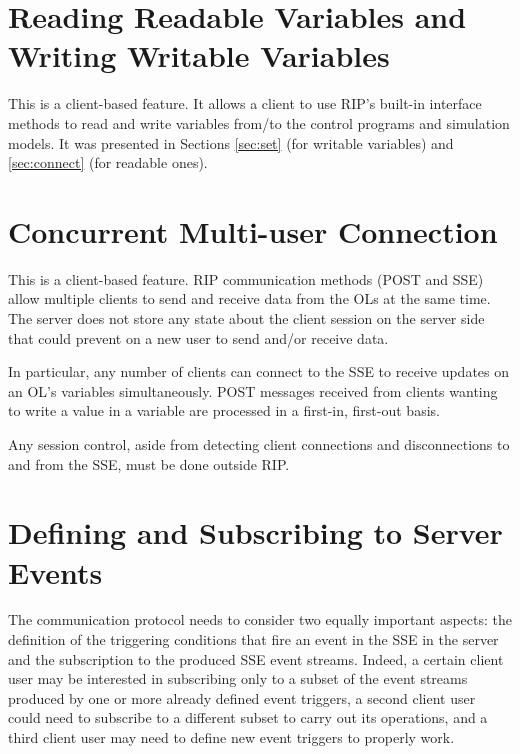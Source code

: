 \section{Reading Readable Variables and Writing Writable Variables}
This is a client-based feature. It allows a client to use RIP's built-in interface methods to read and write variables from/to the control programs and simulation models. It was presented in Sections \ref{sec:set} (for writable variables) and \ref{sec:connect} (for readable ones).

\section{Concurrent Multi-user Connection}
This is a client-based feature. RIP communication methods (POST and SSE) allow multiple clients to send and receive data from the OLs at the same time. The server does not store any state about the client session on the server side that could prevent on a new user to send and/or receive data.

In particular, any number of clients can connect to the SSE to receive updates on an OL's variables simultaneously. POST messages received from clients wanting to write a value in a variable are processed in a first-in, first-out basis.

Any session control, aside from detecting client connections and disconnections to and from the SSE, must be done outside RIP.

\section{Defining and Subscribing to Server Events}
The communication protocol needs to consider two equally important aspects: the definition of the triggering conditions that fire an event in the SSE in the server and the subscription to the produced SSE event streams. Indeed, a certain client user may be interested in subscribing only to a subset of the event streams produced by one or more already defined event triggers, a second client user could need to subscribe to a different subset to carry out its operations, and a third client user may need to define new event triggers to properly work.

